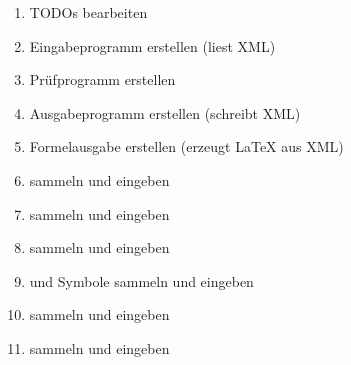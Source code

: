 \begin{enumerate}
	\item TODOs bearbeiten
	\item Eingabeprogramm erstellen (liest XML)
	\item Prüfprogramm erstellen
	\item Ausgabeprogramm erstellen (schreibt XML)
	\item Formelausgabe erstellen (erzeugt \LaTeX{} aus XML)
	\item {} sammeln und eingeben
	\item {} sammeln und eingeben
	\item {} sammeln und eingeben
	\item {} und Symbole sammeln und eingeben
	\item {} sammeln und eingeben
	\item {} sammeln und eingeben
\end{enumerate}

\Endchapter
